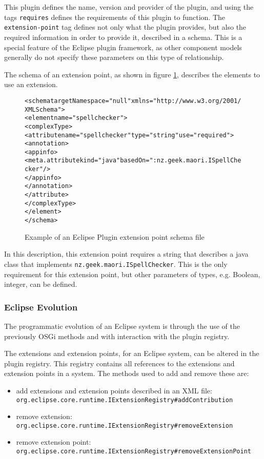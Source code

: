 This plugin defines the name, version and provider of the plugin, and using the tags \verb+requires+ defines the requirements of this plugin to function.
The \verb+extension-point+ tag defines not only what the plugin provides, but also the required information in order to provide it, described in a schema.
This is a special feature of the Eclipse plugin framework, as other component models generally do not specify these parameters on this type of relationship. 

The schema of an extension point, as shown in figure \ref{eclipseextensionschema}, describes the elements to use an extension.

\begin{figure}[htp]
\begin{center}
\begin{alltt}
<schema targetNamespace="null" xmlns="http://www.w3.org/2001/XMLSchema">
 <element name="spellchecker">
  <complexType>
   <attribute name="spellchecker" type="string" use="required">
    <annotation>
     <appinfo>
      <meta.attribute kind="java" basedOn=":nz.geek.maori.ISpellChecker"/>
     </appinfo>
    </annotation>
   </attribute>
  </complexType>
 </element>
</schema>
\end{alltt}
  \caption[Eclipse Plugin extension point schema]{Example of an Eclipse Plugin extension point schema file}
  \label{eclipseextensionschema}
\end{center}
\end{figure}

In this description, this extension point requires a string that describes a java class that implements \verb+nz.geek.maori.ISpellChecker+.
This is the only requirement for this extension point, but other parameters of types, e.g. Boolean, integer, can be defined.

\subsubsection{Eclipse Evolution}
The programmatic evolution of an Eclipse system is through the use of the previously OSGi methods and with interaction with the plugin registry.

The extensions and extension points, for an Eclipse system, can be altered in the plugin registry.
This registry contains all references to the extensions and extension points in a system.
The methods used to add and remove these are:

\begin{itemize}
  \item add extensions and extension points described in an XML file: \\ \verb+org.eclipse.core.runtime.IExtensionRegistry#addContribution+
  \item remove extension: \\ \verb+org.eclipse.core.runtime.IExtensionRegistry#removeExtension+
  \item remove extension point:\\ \verb+org.eclipse.core.runtime.IExtensionRegistry#removeExtensionPoint+
\end{itemize}

